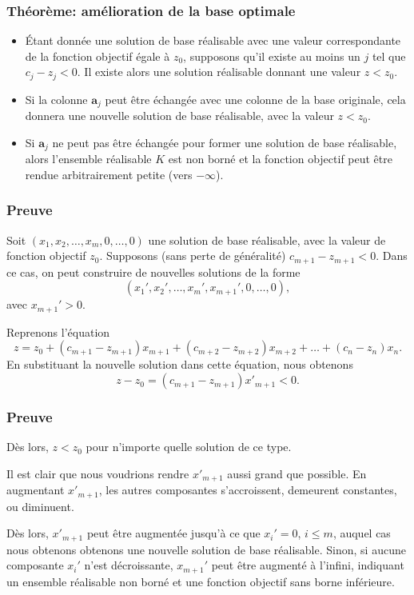 \documentclass[t,usepdftitle=false]{beamer}
\def\ba{\boldsymbol{a}}
\begin{document}
\begin{frame}
\frametitle{Théorème: amélioration de la base optimale}

\begin{itemize}
\item
\'Etant donnée une solution de base réalisable avec une valeur correspondante de la fonction objectif égale à $z_0$, supposons qu'il existe au moins un $j$ tel que $c_j - z_j < 0$.
Il existe alors une solution réalisable donnant une valeur $z < z_0$.
\item
Si la colonne $\ba_j$ peut être échangée avec une colonne de la base originale, cela donnera une nouvelle solution de base réalisable, avec la valeur $z < z_0$.
\item
Si $\ba_j$ ne peut pas être échangée pour former une solution de base réalisable, alors l'ensemble réalisable $K$ est non borné et la fonction objectif peut être rendue arbitrairement petite (vers $-\infty$).
\end{itemize}

\end{frame}

\begin{frame}
\frametitle{Preuve}

Soit $(x_1, x_2,\ldots, x_m, 0,\ldots,0)$ une solution de base réalisable, avec la valeur de fonction objectif $z_0$. Supposons (sans perte de généralité) $c_{m+1} - z_{m+1} < 0$. Dans ce cas, on peut construire de nouvelles solutions de la forme
\[
(x_1', x_2', \ldots, x_m', x_{m+1}', 0, \ldots, 0),
\]
avec $x_{m+1}' > 0$.

\mbox{}

Reprenons l'équation
\[
z = z_0 + (c_{m+1} - z_{m+1})x_{m+1}
+ (c_{m+2} - z_{m+2})x_{m+2} + \ldots
+ (c_{n} - z_n) x_{n}.
\]
En substituant la nouvelle solution dans cette équation, nous obtenons
\[
z - z_0 = (c_{m+1} - z_{m+1})x'_{m+1} < 0.
\]

\end{frame}

\begin{frame}
\frametitle{Preuve}

Dès lors, $z < z_0$ pour n'importe quelle solution de ce type.

\mbox{}

Il est clair que nous voudrions rendre $x'_{m+1}$ aussi grand que possible. En augmentant $x'_{m+1}$, les autres composantes s'accroissent, demeurent constantes, ou diminuent.

\mbox{}

Dès lors, $x'_{m+1}$ peut être augmentée jusqu'à ce que $x_i' = 0$, $i \leq m$, auquel cas nous obtenons obtenons une nouvelle solution de base réalisable. Sinon, si aucune composante $x_i'$ n'est décroissante, $x_{m+1}'$ peut être augmenté à l'infini, indiquant un ensemble réalisable non borné et une fonction objectif sans borne inférieure.
\end{frame}
\end{document}
